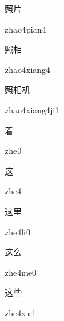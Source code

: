 \begin{verbete}{照片}
\begin{pronuncia}{zhao4pian4}
\end{pronuncia}
\end{verbete}

\begin{verbete}{照相}
\begin{pronuncia}{zhao4xiang4}
\end{pronuncia}
\end{verbete}

\begin{verbete}{照相机}
\begin{pronuncia}{zhao4xiang4ji1}
\end{pronuncia}
\end{verbete}

\begin{verbete}[zhe0]{着}
\begin{pronuncia}{zhe0}
\end{pronuncia}
\end{verbete}

\begin{verbete}[zhe4]{这}
\begin{pronuncia}{zhe4}
\end{pronuncia}
\end{verbete}

\begin{verbete}[zhe4li0]{这里}
\begin{pronuncia}{zhe4li0}
\end{pronuncia}
\end{verbete}

\begin{verbete}[zhe4me0]{这么}
\begin{pronuncia}{zhe4me0}
\end{pronuncia}
\end{verbete}

\begin{verbete}{这些}
\begin{pronuncia}{zhe4xie1}
\end{pronuncia}
\end{verbete}

